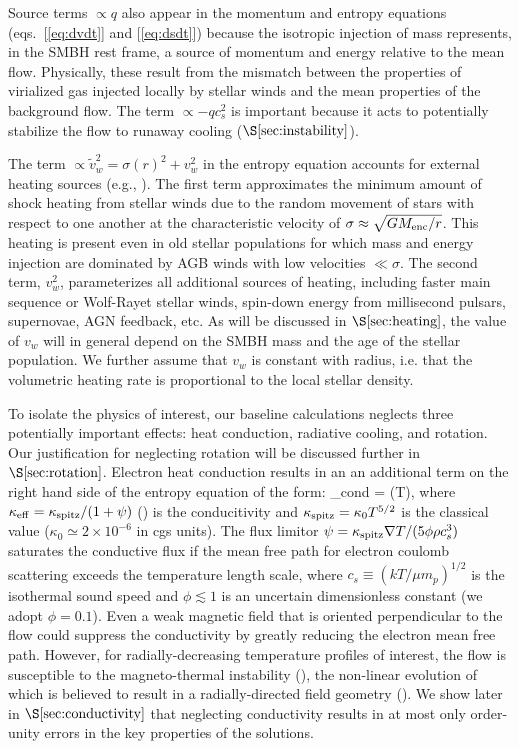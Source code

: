 \documentclass[usenatbib,fleqn]{mn2e}
\newcommand{\vw}{\tilde{v}_{w}}
\begin{document}
Source terms $\propto q$ also appear in the momentum and entropy
equations (eqs.~[\ref{eq:dvdt}] and [\ref{eq:dsdt}]) because the isotropic injection of mass represents, in the SMBH rest frame, a source of momentum
and energy relative to the mean flow.  Physically, these result from
the mismatch between the properties of virialized gas injected locally
by stellar winds and the mean properties of the background flow.  The
term $\propto -q c_{s}^{2}$ is important because it acts to potentially stabilize the flow to runaway cooling ($\S\ref{sec:instability}$).

The term $\propto \vw^2 = \sigma(r)^2+v_{w}^2$ in the entropy
equation accounts for external heating sources (e.g.,
\citealt{ShcherbakovWong+:2014a}).  The first term approximates the
minimum amount of shock heating from stellar winds due to the random movement
of stars with respect to one another at the characteristic velocity of $\sigma \approx \sqrt{GM_{\rm enc}/r}$.  This heating is present even in old stellar populations for which mass and energy injection are dominated by AGB winds with low velocities $\ll \sigma$.  The second term, $v_{w}^{2}$, parameterizes all additional sources of heating, including faster main
sequence or Wolf-Rayet stellar winds, spin-down energy from millisecond pulsars, supernovae, AGN
feedback, etc.  As will be discussed in $\S\ref{sec:heating}$, the value of
$v_{w}$ will in general depend on the SMBH mass and
the age of the stellar population.  We further assume that $v_w$ is constant with radius, i.e. that the volumetric heating rate is proportional to the local stellar density.

To isolate the physics of interest, our baseline calculations neglects three potentially important effects: heat conduction, radiative cooling, and rotation.  Our justification for neglecting rotation will be discussed further in $\S\ref{sec:rotation}$.  Electron heat conduction results in an an additional term on the right hand side of the entropy equation of the form:  
\be {}_{\rm cond} = \nabla\cdot(\kappa \nabla T), \ee
where $\kappa_{\rm
  eff}=\kappa_{\rm spitz}/(1+\psi)$ (\citealt{DaltonBalbus:1993a}) is
the conducitivity and $\kappa_{\rm spitz} = \kappa_0 T^{5/2}$ is the
classical \citet{Spitzer62} value ($\kappa_0\simeq 2\times 10^{-6}$ in
cgs units).  The flux limitor $\psi = \kappa_{\rm spitz} \nabla
T/(5\phi \rho c_s^3)$ saturates the conductive flux if the mean free
path for electron coulomb scattering exceeds the
temperature length scale, where $c_s \equiv (kT/\mu m_p)^{1/2}$ is the
isothermal sound speed and $\phi \lesssim 1$ is an uncertain
dimensionless constant (we adopt $\phi = 0.1$).  Even a weak magnetic
field that is oriented perpendicular to the flow could suppress the
conductivity by greatly reducing the electron mean free path.  However, for radially-decreasing temperature profiles
of interest, the flow is susceptible to the magneto-thermal instability (\citealt{Balbus01}), the non-linear evolution of which is believed to result in a radially-directed field geometry (\citealt{Parrish&Stone07}).  We show later in $\S\ref{sec:conductivity}$ that neglecting conductivity results in at most only order-unity errors in the key properties of the solutions.
\end{document}
